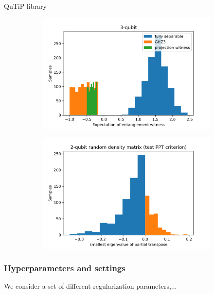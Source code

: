\documentclass[
10pt,
aps,
pra,
linenumbers,
floatfix,
]{revtex4-2}
\theoremstyle{plain}
\theoremstyle{definition}
\begin{document}
QuTiP library \cite{johanssonQuTiPPythonFramework2013}
\begin{figure}[!ht]
	\centering
	\begin{subfigure}{0.49\textwidth}
	\centering
	\includegraphics[width=.9\linewidth]{./notebook/three_qubit_hist.png}
	\end{subfigure}
	\begin{subfigure}{0.49\textwidth}
	\centering
	\includegraphics[width=.9\linewidth]{./notebook/two_qubit_PPT_hist.png}
	\end{subfigure}
\end{figure}

\subsubsection{Hyperparameters and settings}
We consider a set of different regularization parameters,...
\end{document}
